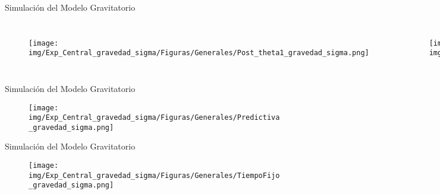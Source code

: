 \documentclass[10pt,aspectratio=169]{beamer}
\begin{document}
\begin{frame}{Simulación del Modelo Gravitatorio}
  \begin{columns}[T,onlytextwidth]

    \begin{figure}
      \centering 
      \texttt{[image: img/Exp\_Central\_gravedad\_sigma/Figuras/Generales/Post\_theta1\_gravedad\_sigma.png]}
    \end{figure} 
    


    \begin{figure}
      \centering 
      \texttt{[image: img/Exp\_Central\_gravedad\_sigma/Figuras/Generales/Post\_theta2\_gravedad\_sigma.png]}
    \end{figure} 

  \end{columns}
\end{frame}

\begin{frame}{Simulación del Modelo Gravitatorio}
  \begin{figure}
    \centering 
    \texttt{[image: img/Exp\_Central\_gravedad\_sigma/Figuras/Generales/Predictiva\_gravedad\_sigma.png]} 
    \label{Fig. 3.2.2.06}
  \end{figure} 
\end{frame}

\begin{frame}{Simulación del Modelo Gravitatorio}
  \begin{figure}[H]
    \centering 
    \texttt{[image: img/Exp\_Central\_gravedad\_sigma/Figuras/Generales/TiempoFijo\_gravedad\_sigma.png]} 
    \label{Fig. 3.2.2.07}
  \end{figure}
\end{frame}


\end{document}
